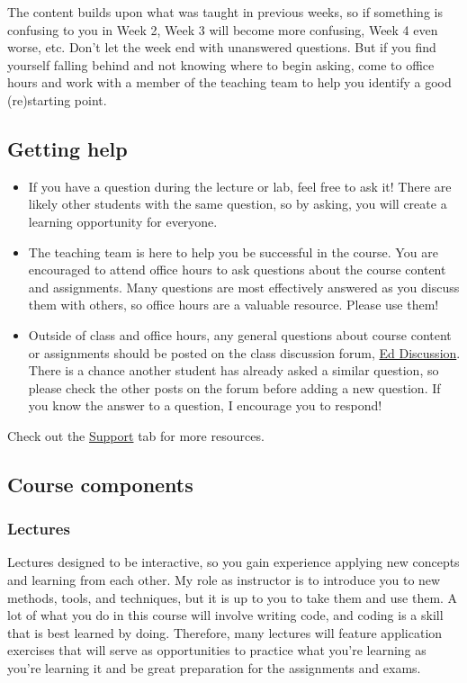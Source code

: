 \documentclass[
  letterpaper,
  DIV=11,
  numbers=noendperiod]{scrartcl}
\providecommand{\tightlist}{%
  \setlength{\itemsep}{0pt}\setlength{\parskip}{0pt}}
\begin{document}
The content builds upon what was taught in previous weeks, so if
something is confusing to you in Week 2, Week 3 will become more
confusing, Week 4 even worse, etc. Don't let the week end with
unanswered questions. But if you find yourself falling behind and not
knowing where to begin asking, come to office hours and work with a
member of the teaching team to help you identify a good (re)starting
point.

\subsection{Getting help}\label{getting-help-1}

\begin{itemize}
\tightlist
\item
  If you have a question during the lecture or lab, feel free to ask it!
  There are likely other students with the same question, so by asking,
  you will create a learning opportunity for everyone.
\item
  The teaching team is here to help you be successful in the course. You
  are encouraged to attend office hours to ask questions about the
  course content and assignments. Many questions are most effectively
  answered as you discuss them with others, so office hours are a
  valuable resource. Please use them!
\item
  Outside of class and office hours, any general questions about course
  content or assignments should be posted on the class discussion forum,
  \href{https://edstem.org/}{Ed Discussion}. There is a chance another
  student has already asked a similar question, so please check the
  other posts on the forum before adding a new question. If you know the
  answer to a question, I encourage you to respond!
\end{itemize}

Check out the \href{course-support.html}{Support} tab for more
resources.

\subsection{Course components}\label{course-components}

\subsubsection{Lectures}\label{lectures}

Lectures designed to be interactive, so you gain experience applying new
concepts and learning from each other. My role as instructor is to
introduce you to new methods, tools, and techniques, but it is up to you
to take them and use them. A lot of what you do in this course will
involve writing code, and coding is a skill that is best learned by
doing. Therefore, many lectures will feature application exercises that
will serve as opportunities to practice what you're learning as you're
learning it and be great preparation for the assignments and exams.
\end{document}
